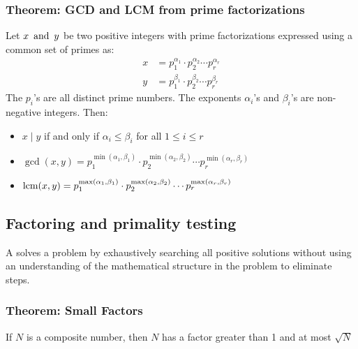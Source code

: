 \subsubsection*{Theorem: GCD and LCM from prime factorizations}
Let $x \operatorname{~\text{and}~} y$ be two positive integers with prime factorizations expressed using a common set of primes as:
\begin{align*}
    x & = p_1^{\alpha_1} \cdot p_2^{\alpha_2} \cdots p_r^{\alpha_r} \\
    y & = p_1^{\beta_1} \cdot p_2^{\beta_2} \cdots p_r^{\beta_r}
\end{align*}
The $p_i$'s are all distinct prime numbers. The exponents $\alpha_i$'s and $\beta_i$'s are non-negative integers. Then:
\begin{itemize}
    \item $x \mid y$ if and only if $\alpha_i \leq \beta_i$ for all $1 \leq i \leq r$
    \item $\gcd(x,y) = p_1^{\min(\alpha_1,\beta_1)} \cdot p_2^{\min(\alpha_2,\beta_2)} \cdots p_r^{\min(\alpha_r,\beta_r)}$
    \item $\operatorname{\text{lcm}}(x,y) = p_1^{\max(\alpha_1,\beta_1)} \cdot p_2^{\max(\alpha_2,\beta_2)} \cdots p_r^{\max(\alpha_r,\beta_r)}$
\end{itemize}

\subsection{Factoring and primality testing}
A  solves a problem by exhaustively searching all positive solutions without using an understanding of the mathematical structure in the problem to eliminate steps.

\subsubsection*{Theorem: Small Factors}
If $N$ is a composite number, then $N$ has a factor greater than 1 and at most $\sqrt{N}$

